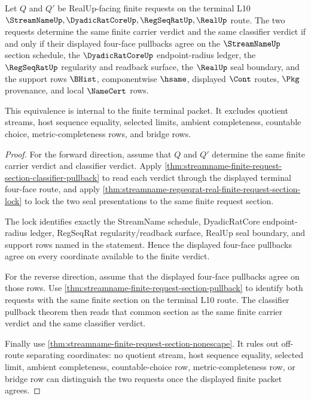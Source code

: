 \begin{theorem}
\label{thm:streamname-finite-request-section-pullback-exactness}
Let $Q$ and $Q'$ be RealUp-facing finite requests on the terminal L10
$\StreamNameUp,\DyadicRatCoreUp,\RegSeqRatUp,\RealUp$ route. The two requests
determine the same finite carrier verdict and the same classifier verdict if
and only if their displayed four-face pullbacks agree on the $\StreamNameUp$
section schedule, the $\DyadicRatCoreUp$ endpoint-radius ledger, the
$\RegSeqRatUp$ regularity and readback surface, the $\RealUp$ seal boundary,
and the support rows $\BHist$, componentwise $\hsame$, displayed $\Cont$
routes, $\Pkg$ provenance, and local $\NameCert$ rows.

This equivalence is internal to the finite terminal packet. It excludes
quotient streams, host sequence equality, selected limits, ambient
completeness, countable choice, metric-completeness rows, and bridge rows.
\end{theorem}
\begin{proof}
For the forward direction, assume that $Q$ and $Q'$ determine the same finite
carrier verdict and classifier verdict. Apply
\autoref{thm:streamname-finite-request-section-classifier-pullback} to read
each verdict through the displayed terminal four-face route, and apply
\autoref{thm:streamname-regseqrat-real-finite-request-section-lock} to lock
the two seal presentations to the same finite request section.

The lock identifies exactly the StreamName schedule, DyadicRatCore
endpoint-radius ledger, RegSeqRat regularity/readback surface, RealUp seal
boundary, and support rows named in the statement. Hence the displayed
four-face pullbacks agree on every coordinate available to the finite verdict.

For the reverse direction, assume that the displayed four-face pullbacks agree
on those rows. Use \autoref{thm:streamname-finite-request-section-pullback} to
identify both requests with the same finite section on the terminal L10 route.
The classifier pullback theorem then reads that common section as the same
finite carrier verdict and the same classifier verdict.

Finally use \autoref{thm:streamname-finite-request-section-nonescape}. It
rules out off-route separating coordinates: no quotient stream, host sequence
equality, selected limit, ambient completeness, countable-choice row,
metric-completeness row, or bridge row can distinguish the two requests once
the displayed finite packet agrees.
\end{proof}

